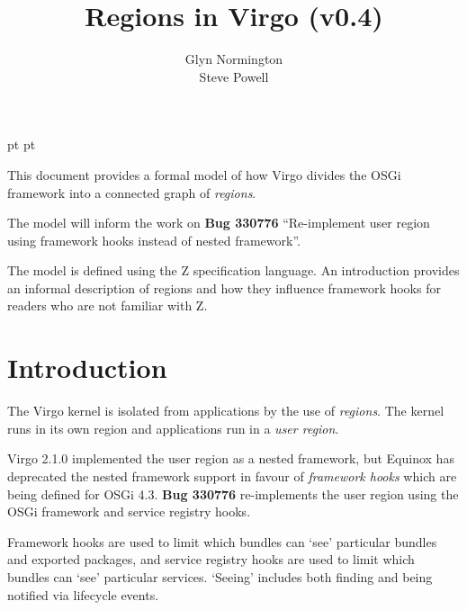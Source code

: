 \documentclass[a4paper,9pt]{article}
\begin{document}
 pt
 pt

\title{Regions in Virgo (v0.4)}
\author{Glyn Normington\\Steve Powell}

\maketitle
\thispagestyle{myheadings}
\setcounter{page}{0}

This document provides a formal model of how Virgo divides the OSGi framework into a connected graph
of \textit{regions}.

The model will inform the work on \textbf{Bug 330776} ``Re-implement user region using
framework hooks instead of nested framework''.

The model is defined using the Z specification language. An introduction provides an informal
description of regions and how they influence framework hooks for readers who are not familiar with Z.

\clearpage
{}
\tableofcontents

\newcommand{\true}{true}
\newcommand{\false}{false}
\renewcommand{\emptyset}{\varnothing}
\newcommand{\ModuleDefZero}{ModuleDef_0}
\newcommand{\ModuleDefOne}{ModuleDef_1}
\newcommand{\ModuleDefTwo}{ModuleDef_2}
\newcommand{\ModuleDefThree}{ModuleDef_3}
\newcommand{\ModuleDefFour}{ModuleDef_4}

\clearpage
{}
\section{Introduction}
\label{cha:intro}

The Virgo kernel is isolated from applications by the use of \textit{regions}.
The kernel runs in its own region and applications run in a \textit{user region}.

Virgo 2.1.0 implemented the user region as a nested framework, but Equinox
has deprecated the nested framework support in favour of \textit{framework hooks}
which are being defined for OSGi 4.3.
\textbf{Bug 330776} re-implements the user region using the OSGi framework and service
registry hooks.

Framework hooks are used to limit which bundles can `see' particular bundles
and exported packages, and service registry hooks are used to limit which bundles
can `see' particular services. `Seeing' includes both finding and being notified via lifecycle events.
\end{document}
